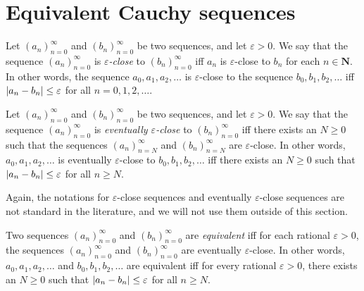 \section{Equivalent Cauchy sequences}\label{sec 5.2}

\begin{definition}\label{5.2.1}
    Let \((a_n)_{n = 0}^{\infty}\) and \((b_n)_{n = 0}^{\infty}\) be two sequences, and let \(\varepsilon > 0\).
    We say that the sequence \((a_n)_{n = 0}^{\infty}\) is \emph{\(\varepsilon\)-close} to \((b_n)_{n = 0}^{\infty}\) iff \(a_n\) is \(\varepsilon\)-close to \(b_n\) for each \(n \in \mathbf{N}\).
    In other words, the sequence \(a_0, a_1, a_2, \dots\) is \(\varepsilon\)-close to the sequence \(b_0, b_1, b_2, \dots\) iff \(\abs*{a_n - b_n} \leq \varepsilon\) for all \(n = 0, 1, 2, \dots\).
\end{definition}

\setcounter{theorem}{2}
\begin{definition}\label{5.2.3}
    Let \((a_n)_{n = 0}^{\infty}\) and \((b_n)_{n = 0}^{\infty}\) be two sequences, and let \(\varepsilon > 0\).
    We say that the sequence \((a_n)_{n = 0}^{\infty}\) is \emph{eventually \(\varepsilon\)-close} to \((b_n)_{n = 0}^{\infty}\) iff there exists an \(N \geq 0\) such that the sequences \((a_n)_{n = N}^{\infty}\) and \((b_n)_{n = N}^{\infty}\) are \(\varepsilon\)-close.
    In other words, \(a_0, a_1, a_2, \dots\) is eventually \(\varepsilon\)-close to \(b_0, b_1, b_2, \dots\) iff there exists an \(N \geq 0\) such that \(\abs*{a_n - b_n} \leq \varepsilon\) for all \(n \geq N\).
\end{definition}

\begin{remark}\label{5.2.4}
    Again, the notations for \(\varepsilon\)-close sequences and eventually \(\varepsilon\)-close sequences are not standard in the literature, and we will not use them outside of this section.
\end{remark}

\setcounter{theorem}{5}
\begin{definition}\label{5.2.6}
    Two sequences \((a_n)_{n = 0}^{\infty}\) and \((b_n)_{n = 0}^{\infty}\) are \emph{equivalent} iff for each rational \(\varepsilon > 0\), the sequences \((a_n)_{n = 0}^{\infty}\) and \((b_n)_{n = 0}^{\infty}\) are eventually \(\varepsilon\)-close.
    In other words, \(a_0, a_1, a_2, \dots\) and \(b_0, b_1, b_2, \dots\) are equivalent iff for every rational \(\varepsilon > 0\), there exists an \(N \geq 0\) such that \(\abs*{a_n - b_n} \leq \varepsilon\) for all \(n \geq N\).
\end{definition}

